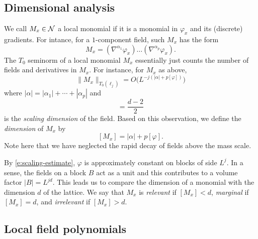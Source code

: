
\subsection{Dimensional analysis}
\label{sec:dimensional}

We call $M_x \in \mathcal{N}$ a local monomial if it is a monomial in $\varphi_x$ and its
(discrete) gradients. For intance, for a $1$-component field, such $M_x$ has the form
\begin{equation}
\label{e:field-mon}
M_x = (\nabla^{\alpha_1} \varphi_x) \ldots (\nabla^{\alpha_p} \varphi_x).
\end{equation}
The $T_0$ seminorm of a local monomial $M_x$ essentially
just counts the number of fields and derivatives in $M_x$. For instance, for $M_x$
as above,
\begin{equation}
\|M_x\|_{T_0(\ell_j)}
	=
O\big(L^{-j (|\alpha| + p [\varphi])}\big)
\end{equation}
where $|\alpha| = |\alpha_1| + \cdots + |\alpha_p|$ and
\begin{equation}
[\varphi] = \frac{d - 2}{2}
\end{equation}
is the \emph{scaling dimension} of the field.
Based on this observation, we define the
\emph{dimension} of $M_x$ by
\begin{equation}
\label{e:mon-dim}
[M_x] = |\alpha| + p [\varphi].
\end{equation}
Note here that we have neglected the rapid decay of fields above the mass scale.

By \eqref{e:scaling-estimate}, $\varphi$ is approximately constant on blocks of side $L^j$. In a sense,
the fields on a block $B$ act as a unit and this contributes to a volume factor $|B| = L^{jd}$.
This leads us to compare the dimension of a monomial with the dimension $d$ of the
lattice. We say that $M_x$ is \emph{relevant} if $[M_x] < d$, \emph{marginal} if
$[M_x] = d$, and \emph{irrelevant} if $[M_x] > d$.


\subsection{Local field polynomials}

